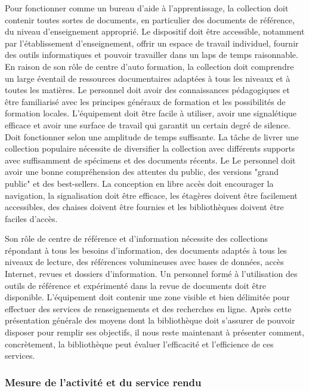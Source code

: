 \documentclass[french,a4paper,12pt]{article}
\begin{document}
\quad Pour fonctionner comme un bureau d'aide à l'apprentissage, la collection doit contenir toutes sortes de documents, en particulier des documents de référence, du niveau d'enseignement approprié. Le dispositif doit être accessible, notamment par l'établissement d'enseignement, offrir un espace de travail individuel, fournir des outils informatiques et pouvoir travailler dans un laps de temps raisonnable. 
 \quad En raison de son rôle de centre d'auto formation, la collection doit comprendre un large éventail de ressources documentaires adaptées à tous les niveaux et à toutes les matières. Le personnel doit avoir des connaissances pédagogiques et être familiarisé avec les principes généraux de formation et les possibilités de formation locales. L'équipement doit être facile à utiliser, avoir une signalétique efficace et avoir une surface de travail qui garantit un certain degré de silence. Doit fonctionner selon une amplitude de temps suffisante. La tâche de livrer une collection populaire nécessite de diversifier la collection avec différents supports avec suffisamment de spécimens et des documents récents. Le Le personnel doit avoir une bonne compréhension des attentes du public, des versions "grand public" et des best-sellers. La conception en libre accès doit encourager la navigation, la signalisation doit être efficace, les étagères doivent être facilement accessibles, des chaises doivent être fournies et les bibliothèques doivent être faciles d'accès. 


\quad Son rôle de centre de référence et d'information nécessite des collections répondant à tous les besoins d'information, des documents adaptés à tous les niveaux de lecture, des références volumineuses avec bases de données, accès Internet, revues et dossiers d'information. Un personnel formé à l'utilisation des outils de référence et expérimenté dans la revue de documents doit être disponible. L'équipement doit contenir une zone visible et bien délimitée pour effectuer des services de renseignements et des recherches en ligne. 
Après cette présentation générale des moyens dont la bibliothèque doit s’assurer de pouvoir disposer pour remplir ses objectifs, il nous reste maintenant à présenter comment, concrètement, la bibliothèque peut évaluer l’efficacité et l’efficience de ces services. 



\subsubsection{Mesure de l’activité et du service rendu} \citep{Gouyon}
\end{document}
